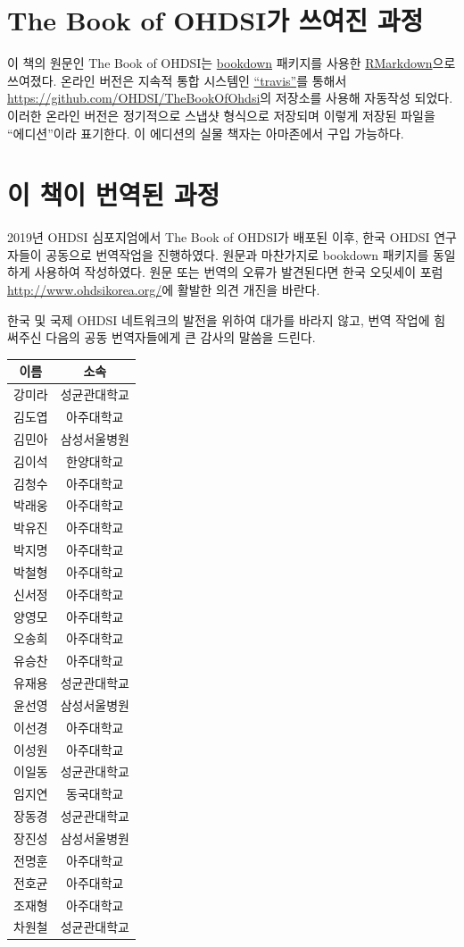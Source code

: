 \documentclass[10.5pt]{book}
\theoremstyle{definition}
\theoremstyle{definition}
\theoremstyle{definition}
\theoremstyle{remark}
\begin{document}
\section*{The Book of OHDSI가 쓰여진 과정}\label{the-book-of-ohdsi--}

이 책의 원문인 The Book of OHDSI는 \href{https://bookdown.org}{bookdown}
패키지를 사용한 \href{https://rmarkdown.rstudio.com}{RMarkdown}으로
쓰여졌다. 온라인 버전은 지속적 통합 시스템인
\href{http://travis-ci.org/}{``travis''}를 통해서
\url{https://github.com/OHDSI/TheBookOfOhdsi}의 저장소를 사용해 자동작성
되었다. 이러한 온라인 버전은 정기적으로 스냅샷 형식으로 저장되며 이렇게
저장된 파일을 ``에디션''이라 표기한다. 이 에디션의 실물 책자는
아마존에서 구입 가능하다.

\section*{이 책이 번역된 과정}\label{---}

2019년 OHDSI 심포지엄에서 The Book of OHDSI가 배포된 이후, 한국 OHDSI
연구자들이 공동으로 번역작업을 진행하였다. 원문과 마찬가지로 bookdown
패키지를 동일하게 사용하여 작성하였다. 원문 또는 번역의 오류가
발견된다면 한국 오딧세이 포럼 \url{http://www.ohdsikorea.org/}에 활발한
의견 개진을 바란다.

한국 및 국제 OHDSI 네트워크의 발전을 위하여 대가를 바라지 않고, 번역
작업에 힘써주신 다음의 공동 번역자들에게 큰 감사의 말씀을 드린다.

\begin{longtable}[]{@{}cc@{}}
\toprule
이름 & 소속\tabularnewline
\midrule
\endhead
강미라 & 성균관대학교\tabularnewline
김도엽 & 아주대학교\tabularnewline
김민아 & 삼성서울병원\tabularnewline
김이석 & 한양대학교\tabularnewline
김청수 & 아주대학교\tabularnewline
박래웅 & 아주대학교\tabularnewline
박유진 & 아주대학교\tabularnewline
박지명 & 아주대학교\tabularnewline
박철형 & 아주대학교\tabularnewline
신서정 & 아주대학교\tabularnewline
양영모 & 아주대학교\tabularnewline
오송희 & 아주대학교\tabularnewline
유승찬 & 아주대학교\tabularnewline
유재용 & 성균관대학교\tabularnewline
윤선영 & 삼성서울병원\tabularnewline
이선경 & 아주대학교\tabularnewline
이성원 & 아주대학교\tabularnewline
이일동 & 성균관대학교\tabularnewline
임지연 & 동국대학교\tabularnewline
장동경 & 성균관대학교\tabularnewline
장진성 & 삼성서울병원\tabularnewline
전명훈 & 아주대학교\tabularnewline
전호균 & 아주대학교\tabularnewline
조재형 & 아주대학교\tabularnewline
차원철 & 성균관대학교\tabularnewline
\bottomrule
\end{longtable}
\end{document}
